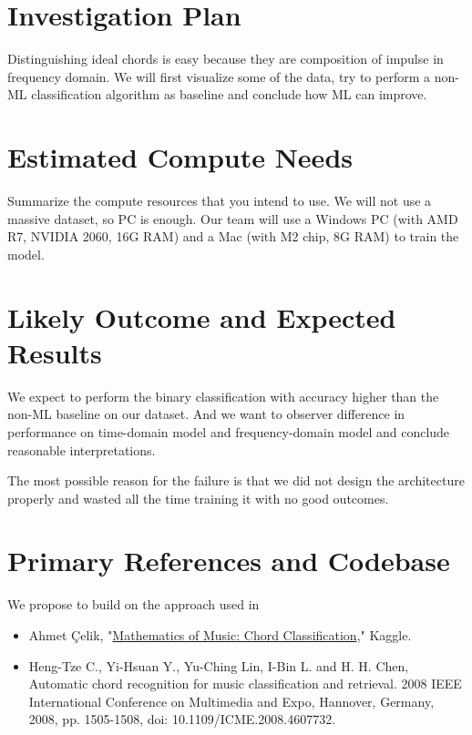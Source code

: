 \documentclass[11pt]{article}
\begin{document}
\section*{Investigation Plan}
Distinguishing ideal chords is easy because they are composition of impulse in frequency domain. We will first visualize some of the data, try to perform a non-ML classification algorithm as baseline and conclude how ML can improve. 


\section*{Estimated Compute Needs}

Summarize the compute resources that you intend to use.
We will not use a massive dataset, so PC is enough. Our team will use a Windows PC (with AMD R7, NVIDIA 2060, 16G RAM) and a Mac (with M2 chip,  8G RAM) to train the model.


\section*{Likely Outcome and Expected Results}
We expect to perform the binary classification with accuracy higher than the non-ML baseline on our dataset. And we want to observer difference in performance on time-domain model and frequency-domain model and conclude reasonable interpretations.

The most possible reason for the failure is that we did not design the architecture properly and wasted all the time training it with no good outcomes.


\section*{Primary References and Codebase}

We propose to build on the approach used in

\begin{itemize}
  \item
  Ahmet Çelik, "\href{https://www.kaggle.com/code/ahmetcelik158/mathematics-of-music-chord-classification}{Mathematics of Music: Chord Classification}," Kaggle.

  \item
  Heng-Tze C., Yi-Hsuan Y., Yu-Ching Lin, I-Bin L. and H. H. Chen,  {Automatic chord recognition for music classification and retrieval}. 2008 IEEE International Conference on Multimedia and Expo, Hannover, Germany, 2008, pp. 1505-1508, doi: 10.1109/ICME.2008.4607732.

\end{itemize}

 
\end{document}
